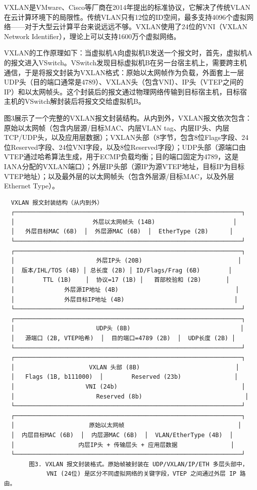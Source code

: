 VXLAN是VMware、Cisco等厂商在2014年提出的标准协议，它解决了传统VLAN在云计算环境下的局限性。传统VLAN只有12位的ID空间，最多支持4096个虚拟网络——对于大型云计算平台来说远远不够。VXLAN使用了24位的VNI（VXLAN Network Identifier），理论上可以支持1600万个虚拟网络。

VXLAN的工作原理如下：当虚拟机A向虚拟机B发送一个报文时，首先，虚拟机A的报文进入VSwitch。VSwitch发现目标虚拟机B在另一台宿主机上，需要跨主机通信，于是将报文封装为VXLAN格式：原始以太网帧作为负载，外面套上一层UDP头（目的端口通常是4789）、VXLAN头（包含VNI）、IP头（VTEP之间的IP）和以太网帧头。这个封装后的报文通过物理网络传输到目标宿主机，目标宿主机的VSwitch解封装后将报文交给虚拟机B。

图3展示了一个完整的VXLAN报文封装结构。从内到外，VXLAN报文依次包含：原始以太网帧（包含内层源/目标MAC、内层VLAN tag、内层IP头、内层TCP/UDP头，以及应用层数据）；VXLAN头部（8字节，包含8位Flags字段、24位Reserved字段、24位VNI字段，以及8位Reserved字段）；UDP头部（源端口由VTEP通过哈希算法生成，用于ECMP负载均衡；目的端口固定为4789，这是IANA分配的VXLAN端口）；外层IP头部（源IP为源VTEP地址，目标IP为目标VTEP地址）；以及最外层的以太网帧头（包含外层源/目标MAC，以及外层Ethernet Type）。

\begin{verbatim}
  VXLAN 报文封装结构（从内到外）
  ┌────────────────────────────────────────────────────────────────┐
  │                      外层以太网帧头 (14B)                      │
  │   外层目标MAC (6B)  │  外层源MAC (6B)  │  EtherType (2B)      │
  └────────────────────────────────────────────────────────────────┘
  ┌────────────────────────────────────────────────────────────────┐
  │                       外层IP头 (20B)                           │
  │  版本/IHL/TOS (4B) │ 总长度 (2B) │ ID/Flags/Frag (6B)        │
  │        TTL (1B)    │  协议=17 (1B) │   首部校验和 (2B)       │
  │              外层源IP地址 (4B)                                 │
  │              外层目标IP地址 (4B)                               │
  └────────────────────────────────────────────────────────────────┘
  ┌────────────────────────────────────────────────────────────────┐
  │                       UDP头 (8B)                               │
  │   源端口 (2B, VTEP哈希)  │  目的端口=4789 (2B)  │  UDP长度 (2B) │
  └────────────────────────────────────────────────────────────────┘
  ┌────────────────────────────────────────────────────────────────┐
  │                     VXLAN 头部 (8B)                           │
  │   Flags (1B, b111000)  │        Reserved (23b)               │
  │                    VNI (24b)                                   │
  │                       Reserved (8b)                             │
  └────────────────────────────────────────────────────────────────┘
  ┌────────────────────────────────────────────────────────────────┐
  │                     原始以太网帧                                │
  │  内层目标MAC (6B)  │  内层源MAC (6B)  │  VLAN/EtherType (4B)  │
  │                  内层IP头 + 传输层头 + 应用层数据               │
  └────────────────────────────────────────────────────────────────┘
       图3. VXLAN 报文封装格式。原始帧被封装在 UDP/VXLAN/IP/ETH 多层头部中，
            VNI (24位) 是区分不同虚拟网络的关键字段，VTEP 之间通过外层 IP 路由。
\end{verbatim}

